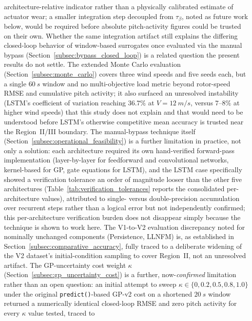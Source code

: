 architecture-relative indicator rather than a physically calibrated
estimate of actuator wear; a smaller integration step decoupled from
$\tau_\beta$, noted as future work below, would be required before
absolute pitch-activity figures could be trusted on their own.
Whether the same integration artifact still explains the differing
closed-loop behavior of window-based surrogates once evaluated via the
manual bypass (Section~\ref{subsec:bypass_closed_loop}) is a related
question the present results do not settle. The
extended Monte Carlo evaluation (Section~\ref{subsec:monte_carlo}) covers
three wind speeds and five seeds each, but a single $\SI{60}{s}$ window
and no multi-objective load metric beyond rotor-speed RMSE and
cumulative pitch activity; it also surfaced an unresolved instability
(LSTM's coefficient of variation reaching $36.7\%$ at
$V=\SI{12}{m/s}$, versus $7$--$8\%$ at higher wind speeds) that this
study does not explain and that would need to be understood before
LSTM's otherwise competitive mean accuracy is trusted near the
Region~II/III boundary. The manual-bypass technique itself
(Section~\ref{subsec:operational_feasibility}) is a further limitation
in practice, not only a solution: each architecture required its own
hand-verified forward-pass implementation (layer-by-layer for
feedforward and convolutional networks, kernel-based for GP, gate
equations for LSTM), and the LSTM case specifically showed a
verification tolerance an order of magnitude looser than the other
five architectures (Table~\ref{tab:verification_tolerances} reports
the consolidated per-architecture values), attributed to single-
versus double-precision
accumulation over recurrent steps rather than a logical error but not
independently confirmed; this per-architecture verification burden does
not disappear simply because the technique is shown to work here.
The V1-to-V2 evaluation discrepancy noted for nominally unchanged
components (Persistence, LLNFM) is, as established in
Section~\ref{subsec:comparative_accuracy}, fully traced to a
deliberate widening of the V2 dataset's initial-condition sampling to
cover Region~II, not an unresolved artifact. The GP-uncertainty cost
weight $\kappa$ (Section~\ref{subsec:gp_uncertainty_cost}) is a further,
now-\emph{confirmed} limitation rather than an open question: an initial
attempt
to sweep $\kappa \in \{0, 0.2, 0.5, 0.8, 1.0\}$ under the original
\texttt{predict()}-based GP-v2 cost on a shortened $\SI{20}{s}$ window
returned a numerically identical closed-loop RMSE and zero pitch
activity for every $\kappa$ value tested, traced to

